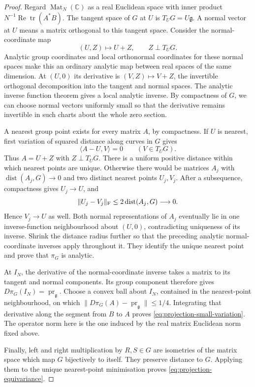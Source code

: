 \documentclass[11pt,reqno]{amsart}
\numberwithin{equation}{section}
\theoremstyle{definition}
\theoremstyle{remark}
\newcommand{\C}{\mathbb C}
\newcommand{\g}{\mathfrak g}
\DeclareMathOperator{\tr}{tr}
\begin{document}
\begin{proof}
Regard \(\operatorname{Mat}_N(\C)\) as a real Euclidean space
with inner product \(N^{-1}\operatorname{Re}\tr(A^*B)\).
The tangent space of \(G\) at \(U\) is \(T_UG=U\g\).
A normal vector at \(U\) means a matrix orthogonal to this
tangent space. Consider the normal-coordinate map
\[
                    (U,Z)\longmapsto U+Z,
                    \qquad Z\perp T_UG.
\]
Analytic group coordinates and local orthonormal coordinates for
these normal spaces make this an ordinary analytic map between
real spaces of the same dimension. At \((U,0)\) its derivative
is \((V,Z)\mapsto V+Z\), the invertible orthogonal decomposition
into the tangent and normal spaces. The analytic inverse function
theorem gives a local analytic inverse. By compactness of \(G\),
we can choose normal vectors uniformly small so that the derivative
remains invertible in such charts about the whole zero section.

A nearest group point exists for every matrix \(A\), by compactness.
If \(U\) is nearest, first variation of squared distance along
curves in \(G\) gives
\[
                   \langle A-U,V\rangle=0\qquad(V\in T_UG).
\]
Thus \(A=U+Z\) with \(Z\perp T_UG\).
There is a uniform positive distance within which nearest points
are unique. Otherwise there would be matrices \(A_j\) with
\(\operatorname{dist}(A_j,G)\to0\) and two distinct nearest
points \(U_j,V_j\). After a subsequence, compactness gives
\(U_j\to U\), and
\[
        \|U_j-V_j\|_{\rm F}
                 \le2\operatorname{dist}(A_j,G)\longrightarrow0.
\]
Hence \(V_j\to U\) as well. Both normal representations of
\(A_j\) eventually lie in one inverse-function neighbourhood
about \((U,0)\), contradicting uniqueness of its inverse.
Shrink the distance radius further so that the preceding analytic
normal-coordinate inverses apply throughout it. They identify
the unique nearest point and prove that \(\pi_G\) is analytic.

At \(I_N\), the derivative of the normal-coordinate inverse
takes a matrix to its tangent and normal components. Its group
component therefore gives \(D\pi_G(I_N)=\operatorname{pr}_{\g}\).
Choose a convex ball about \(I_N\), contained in the nearest-point
neighbourhood, on which
\(\|D\pi_G(A)-\operatorname{pr}_{\g}\|\le1/4\).
Integrating that derivative along the segment from \(B\) to
\(A\) proves \eqref{eq:projection-small-variation}.
The operator norm here is the one induced by the real matrix
Euclidean norm fixed above.

Finally, left and right multiplication by \(R,S\in G\) are
isometries of the matrix space which map \(G\) bijectively to
itself. They preserve distance to \(G\). Applying them to the
unique nearest-point minimisation proves
\eqref{eq:projection-equivariance}.
\end{proof}
\end{document}
